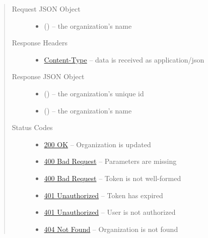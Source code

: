 \documentclass[letterpaper,10pt,english]{sphinxmanual}
\begin{document}
\begin{fulllineitems}
\begin{quote}
\begin{description}
\begin{itemize}
\end{itemize}

\item[{Request JSON Object}] \leavevmode\begin{itemize}
\item {} 
 () -- the organization's name

\end{itemize}

\item[{Response Headers}] \leavevmode\begin{itemize}
\item {} 
\href{http://tools.ietf.org/html/rfc7231\#section-3.1.1.5}{Content-Type} -- data is received as application/json

\end{itemize}

\item[{Response JSON Object}] \leavevmode\begin{itemize}
\item {} 
 () -- the organization's unique id

\item {} 
 () -- the organization's name

\end{itemize}

\item[{Status Codes}] \leavevmode\begin{itemize}
\item {} 
\href{http://www.w3.org/Protocols/rfc2616/rfc2616-sec10.html\#sec10.2.1}{200 OK} -- Organization is updated

\item {} 
\href{http://www.w3.org/Protocols/rfc2616/rfc2616-sec10.html\#sec10.4.1}{400 Bad Request} -- Parameters are missing

\item {} 
\href{http://www.w3.org/Protocols/rfc2616/rfc2616-sec10.html\#sec10.4.1}{400 Bad Request} -- Token is not well-formed

\item {} 
\href{http://www.w3.org/Protocols/rfc2616/rfc2616-sec10.html\#sec10.4.2}{401 Unauthorized} -- Token has expired

\item {} 
\href{http://www.w3.org/Protocols/rfc2616/rfc2616-sec10.html\#sec10.4.2}{401 Unauthorized} -- User is not authorized

\item {} 
\href{http://www.w3.org/Protocols/rfc2616/rfc2616-sec10.html\#sec10.4.5}{404 Not Found} -- Organization is not found

\end{itemize}

\end{description}\end{quote}

\end{fulllineitems}
\end{document}
